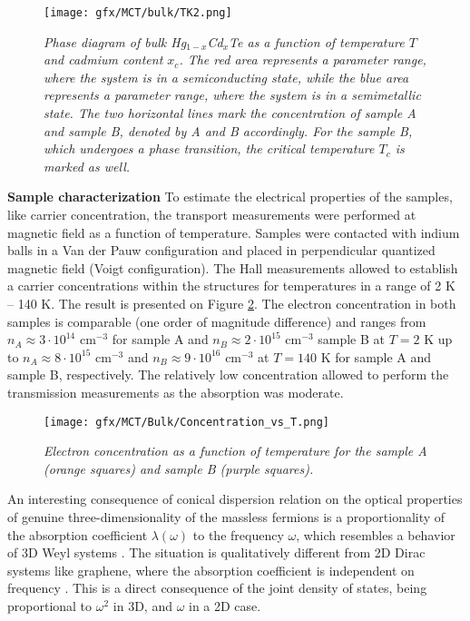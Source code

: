\documentclass[titlepage,a4paper]{book}
\begin{document}
\begin{figure}[H]
	\centering
	\texttt{[image: gfx/MCT/bulk/TK2.png]}
	\vspace{-10pt}
	\caption{\textit{Phase diagram of bulk Hg$_{1-x}$Cd$_x$Te as a function of temperature $T$ and cadmium content $x_c$. The red area represents a parameter range, where the system is in a semiconducting state, while the blue area represents a parameter range, where the system is in a semimetallic state. The two horizontal lines mark the concentration of sample A and sample B, denoted by A and B accordingly. For the sample B, which undergoes a phase transition, the critical temperature $T_c$ is marked as well.}}
	\label{fig:TK2}
\end{figure} 

\textbf{Sample characterization}
To estimate the electrical properties of the samples, like carrier concentration, the transport measurements were performed at magnetic field as a function of temperature. Samples were contacted with indium balls in a Van der Pauw configuration and placed in perpendicular quantized magnetic field (Voigt configuration). The Hall measurements allowed to establish a carrier concentrations within the structures for temperatures in a range of 2 K -- 140 K. The result is presented on Figure \ref{fig:Samples_MCT_Transport}. The electron concentration in both samples is comparable (one order of magnitude difference) and ranges from $n_A \approx 3 \cdot 10^{14}$ cm$^{-3}$ for sample A and $n_B \approx 2 \cdot 10^{15}$ cm$^{-3}$ sample B at $T = 2$ K up to
$n_A \approx 8 \cdot 10^{15}$ cm$^{-3}$ and $n_B \approx 9 \cdot 10^{16}$ cm$^{-3}$ at $T = 140$ K for sample A and sample B, respectively. The relatively low concentration allowed to perform the transmission measurements as the absorption was moderate.
\begin{figure}[ht]
	\centering
	\texttt{[image: gfx/MCT/Bulk/Concentration\_vs\_T.png]}
	\vspace{-10pt}
	\caption{\textit{Electron concentration as a function of temperature for the sample A (orange squares) and sample B (purple squares).}}
	\label{fig:Samples_MCT_Transport}
\end{figure} 

An interesting consequence of conical dispersion relation on the optical properties of genuine three-dimensionality of the massless fermions is a proportionality of the absorption coefficient $\lambda (\omega)$ to the frequency $\omega$, which resembles a behavior of 3D Weyl systems \cite{Malcolm_MCT}. The situation is qualitatively different from 2D Dirac systems like graphene, where the absorption coefficient is independent on frequency \cite{Kuzmenko_MCTBulk}. This is a direct consequence of the joint density of states, being proportional to $\omega^2$ in 3D, and $\omega$ in a 2D case.  
\end{document}
